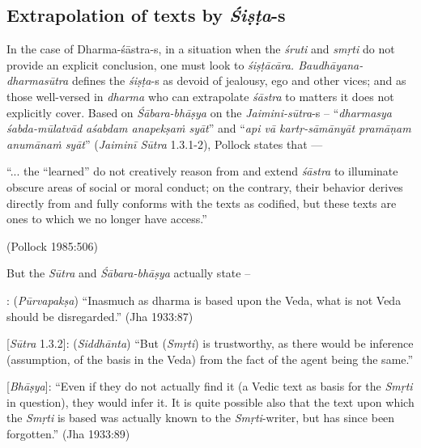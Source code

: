 \subsection{Extrapolation of texts by {{\sl\bfseries Śiṣṭa}\relax}-s}\label{art12-sec3.6}

In the case of Dharma-śāstra-s, in a situation when the {\sl śruti} and {\sl smṛti} do not provide an explicit conclusion, one must look to {\sl śiṣṭācāra. Baudhāyana-dharmasūtra} deﬁnes the {\sl śiṣṭa}-s as devoid of jealousy, ego and other vices; and as those well-versed in {\sl dharma} who can extrapolate {\sl śāstra} to matters it does not explicitly cover. Based on {\sl Śābara-bhāṣya} on the {\sl Jaimini-sūtra}-s -- ``{\sl dharmasya śabda-mūlatvād aśabdam anapekṣaṁ syāt}''  and ``{\sl api vā kartṛ-sāmānyāt pramāṇam anumānaṁ syāt}'' ({\sl Jaiminī Sūtra} 1.3.1-2), Pollock states that ---

\begin{myquote}
``... the ``learned'' do not creatively reason from and extend {\sl śāstra} to illuminate obscure areas of social or moral conduct; on the contrary, their behavior derives directly from and fully conforms with the texts as codiﬁed, but these texts are ones to which we no longer have access.'' 

\hfill (Pollock 1985:506)
\end{myquote}

\newpage

But the {\sl Sūtra} and {\sl Śābara-bhāṣya} actually state --
\begin{myquote}
[{\sl Sūtra} 1.3.1]: ({\sl Pūrvapakṣa}) ``Inasmuch as dharma is based upon the Veda, what is not Veda should be disregarded.'' (Jha 1933:87) 

[{\sl Sūtra} 1.3.2]: ({\sl Siddhānta}) ``But ({\sl Smṛti}) is trustworthy, as there would be inference (assumption, of the basis in the Veda) from the fact of the agent being the same.'' 

[{\sl Bhāṣya}]: ``Even if they do not actually find it (a Vedic text as basis for the {\sl Smṛti} in question), they would infer it. It is quite possible also that the text upon which the {\sl Smṛti} is based was actually known to the {\sl Smṛti}-writer, but has since been forgotten.'' (Jha 1933:89)
\end{myquote}

